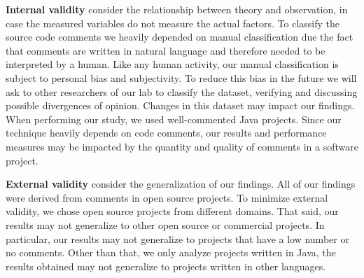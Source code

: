 \noindent\textbf{Internal validity} consider the relationship between theory and observation, in case the measured variables do not measure the actual factors. To classify the source code comments we heavily depended on manual classification due the fact that comments are written in natural language and therefore needed to be interpreted by a human. Like any human activity, our manual classification is subject to personal bias and subjectivity. To reduce this bias in the future we will ask to other researchers of our lab to classify the dataset, verifying and discussing possible divergences of opinion. Changes in this dataset may impact our findings. When performing our study, we used well-commented Java projects. Since our technique heavily depends on code comments, our results and performance measures may be impacted by the quantity and quality of comments in a software project.  

\noindent \textbf{External validity} consider the generalization of our findings. All of our findings were derived from comments in open source projects. To minimize external validity, we chose open source projects from different domains. That said, our results may not generalize to other open source or commercial projects. In particular, our results may not generalize to projects that have a low number or no comments. Other than that, we only analyze projects written in Java, the results obtained may not generalize to projects written in other languages.